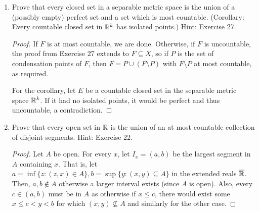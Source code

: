 \begin{enumerate}
\begin{proof}
Now, let $y \in W$, so $y \in V_n$ for some $n$ such that $E \cap V_n$ is at most countable. Then, $V_n$ contains some neighbourhood of $y$ which contains at most countably many points in $E$, so $y \not\in P$. Thus $W \subseteq P^c$ and so $P \subseteq W^c$, so we conclude $P = W^c$. 

The fact that $P^c \cap E = W \cap E$ is at most countable follows by construction. Now we claim $W^c$ is perfect. The fact that $W^c$ is closed follows directly from the fact that it is the complement of a countable union of open sets. It suffices to show that each point of $W^c$ is a limit point of $W^c$. Let $x \in W^c$. If some neighbourhood of $x$ did not contain any points in $W^c$, then there must be only points in $W \cap E$. However, there are at most countably many of these points, and any neighbourhood of $x$ is uncountable. Thus the result follows.
\end{proof}

\item %
Prove that every closed set in a separable metric space is the union of a (possibly empty) perfect set and a set which is most countable. (Corollary: Every countable closed set in $\mathbb{R}^k$ has isolated points.) Hint: Exercise 27.

\begin{proof}
If $F$ is at most countable, we are done. Otherwise, if $F$ is uncountable, the proof from Exercise 27 extends to $F \subseteq X$, so if $P$ is the set of condensation points of $F$, then $F = P \cup (F \setminus P)$ with $F \setminus P$ at most countable, as required.

For the corollary, let $E$ be a countable closed set in the separable metric space $\mathbb{R}^k$. If it had no isolated points, it would be perfect and thus uncountable, a contradiction.
\end{proof}

\item %
Prove that every open set in $\mathbb{R}$ is the union of an at most countable collection of disjoint segments. Hint: Exercise 22.

\begin{proof}
Let $A$ be open. For every $x$, let $I_x = (a, b)$ be the largest segment in $A$ containing $x$. That is, let $a = \inf\{z: (z, x) \in A\}, b = \sup\{y: (x, y) \subseteq A\}$ in the extended reals $\overline{\mathbb{R}}$. Then, $a, b \not\in A$ otherwise a larger interval exists (since $A$ is open). Also, every $c \in (a, b)$ must be in $A$ as otherwise if $x \le c$, there would exist some $x \le c < y < b$ for which $(x, y) \not\subseteq A$ and similarly for the other case. 


\end{proof}
\end{enumerate}
